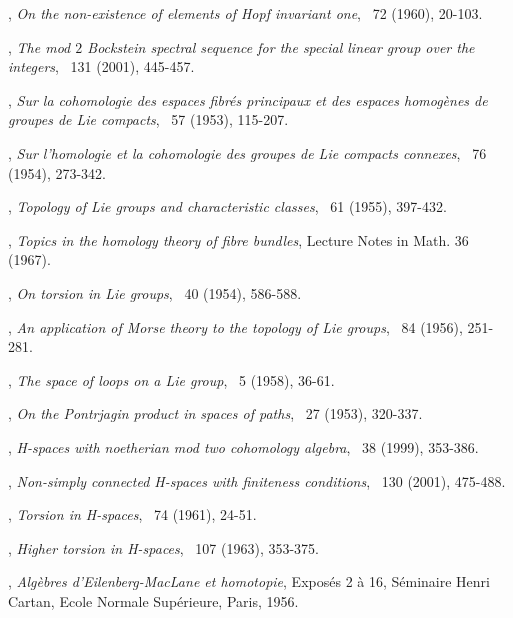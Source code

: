 

\begin{thebibliography}{99}

, \textit{On the non-existence of elements of Hopf invariant one}, \ANNMAone\ 72 (1960), 20-103.

, \textit{The mod $2$ Bockstein spectral sequence for the special linear group over the integers}, \MATPC\ 131 (2001), 445-457.

, \textit{Sur la cohomologie des espaces fibr\'es principaux et des espaces homog\`enes de groupes de Lie compacts}, \ANNMAone\ 57 (1953), 115-207.

, \textit{Sur l'homologie et la cohomologie des groupes de Lie compacts connexes}, \AMEJM\ 76 (1954), 273-342.

, \textit{Topology of Lie groups and characteristic classes}, \BULAMone\ 61 (1955), 397-432.

, \textit{Topics in the homology theory of fibre bundles}, Lecture Notes in Math. 36 (1967).

, \textit{On torsion in Lie groups}, \PRONA\ 40 (1954), 586-588.

, \textit{An application of Morse theory to the topology of Lie groups}, \BULAMone\ 84 (1956), 251-281.

, \textit{The space of loops on a Lie group}, \MICMJ\ 5 (1958), 36-61.

, \textit{On the Pontrjagin product in spaces of paths}, \COMMH\ 27 (1953), 320-337.

, \textit{H-spaces with noetherian mod two cohomology algebra}, \TOPOL\ 38 (1999), 353-386.

, \textit{Non-simply connected H-spaces with finiteness conditions}, \MATPC\ 130 (2001), 475-488.

, \textit{Torsion in H-spaces}, \ANNMAone\ 74 (1961), 24-51.

, \textit{Higher torsion in H-spaces}, \TRAAM\ 107 (1963), 353-375.

, \textit{Alg\`ebres d'Eilenberg-MacLane et homotopie}, Expos\'es 2 \`a 16, S\'eminaire Henri Cartan, Ecole Normale Sup\'erieure, Paris, 1956. 


\end{thebibliography}
